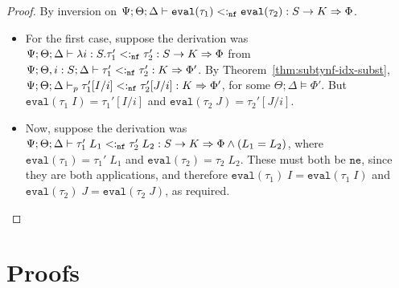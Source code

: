 \evalapplemma*
\begin{proof}
By inversion on $\Psi ; \Theta ; \Delta \vdash \texttt{eval}(\tau_1) <:_{\texttt{nf}} \texttt{eval}(\tau_2) : S \to K \Rightarrow \Phi$.
\begin{itemize}
  \item For the first case, suppose the derivation was $\Psi ; \Theta ; \Delta \vdash \lambda i : S. \tau_1' <:_{\texttt{nf}} \tau_2' : S \to K \Rightarrow \Phi$
  from $\Psi ; \Theta, i : S ; \Delta \vdash \tau_1' <:_{\texttt{nf}} \tau_2' : K \Rightarrow \Phi'$. By Theorem~\ref{thm:subtynf-idx-subst},
  $\Psi ; \Theta ; \Delta \vdash_p \tau_1'[I/i] <:_{\texttt{nf}} \tau_2'[J/i] : K \Rightarrow \Phi'$, for some $\Theta ; \Delta \vDash \Phi'$. But $\texttt{eval}(\tau_1 \; I) = \tau_1'[I/i]$ and $\texttt{eval}(\tau_2 \; J) = \tau_2'[J/i]$.
  \item Now, suppose the derivation was $\Psi ; \Theta ; \Delta \vdash \tau_1' \; L_1 <:_{\texttt{nf}} \tau_2' \; L_2 : S \to K \Rightarrow \Phi \wedge (L_1 = L_2)$, where $\texttt{eval}(\tau_1) = \tau_1' \; L_1$ and $\texttt{eval}(\tau_2) = \tau_2 \; L_2$. These must both be $\texttt{ne}$, since they are both applications, and therefore
  $\texttt{eval}(\tau_1) \; I = \texttt{eval}(\tau_1 \; I)$ and $\texttt{eval}(\tau_2) \; J = \texttt{eval}(\tau_2 \; J)$, as required.
\end{itemize}
\end{proof}

\subtycompl*

\admitsweaken*

\tycheckcompl*

\section{Proofs}


































